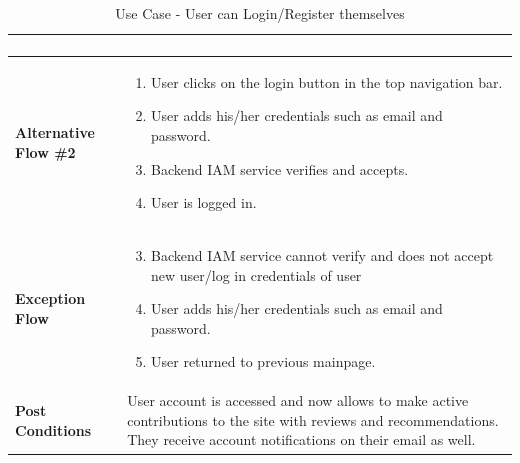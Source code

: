 \begin{table}[H]
{\begin{tabular}{|p{.3\linewidth}|p{.7\linewidth}|}
\begin{minipage}[H]{\linewidth}
\begin{enumerate}[label=\textbf{Step \arabic*:},leftmargin=1.5\leftmargin]
          \end{enumerate}
        \end{minipage} \\
      \hline
      \textbf{Alternative Flow \#2} & 
        \begin{minipage}[H]{\linewidth} 
          \begin{enumerate}[label=\textbf{Step \arabic*:},leftmargin=1.5\leftmargin]
            \item User clicks on the login button in the top navigation bar.
            \item User adds his/her credentials such as email and password.
            \item Backend IAM service verifies and accepts.
            \item User is logged in.
          \end{enumerate}
        \end{minipage} \\
      \hline
      \textbf{Exception Flow} & 
        \begin{minipage}[H]{\linewidth}
          \begin{enumerate}[label=\textbf{Step \arabic*:},leftmargin=1.5\leftmargin]
            \setcounter{enumi}{2}
            \item Backend IAM service cannot verify and does not accept new user/log in credentials of user
            \item User adds his/her credentials such as email and password.
            \item User returned to previous mainpage.
          \end{enumerate}
        \end{minipage}
       \\
      \hline
      \textbf{Post Conditions} & User account is accessed and now allows to make active contributions to the site with reviews and recommendations. They receive account notifications on their email as well. \\
      \hline
    \end{tabular}
  }
  \caption{Use Case - User can Login/Register themselves}
\end{table}

